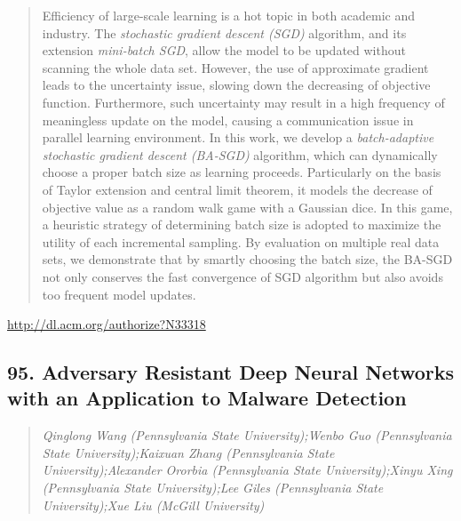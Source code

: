 \documentclass{article}
\begin{document}
\begin{quote}
Efficiency of large-scale learning is a hot topic in both academic and industry. The \emph{stochastic gradient descent (SGD)} algorithm, and its extension \emph{mini-batch SGD}, allow the model to be updated without scanning the whole data set. However, the use of approximate gradient leads to the uncertainty issue, slowing down the decreasing of objective function. Furthermore, such uncertainty may result in a high frequency of meaningless update on the model, causing a communication issue in parallel learning environment. In this work, we develop a \emph{batch-adaptive stochastic gradient descent (BA-SGD)} algorithm, which can dynamically choose a proper batch size as learning proceeds. Particularly on the basis of Taylor extension and central limit theorem, it models the decrease of objective value as a random walk game with a Gaussian dice. In this game, a heuristic strategy of determining batch size is adopted to maximize the utility of each incremental sampling. By evaluation on multiple real data sets, we demonstrate that by smartly choosing the batch size, the BA-SGD not only conserves the fast convergence of SGD algorithm but also avoids too frequent model updates.
\end{quote}

\href{http://dl.acm.org/authorize?N33318}{http://dl.acm.org/authorize?N33318}

\subsection{95. Adversary Resistant Deep Neural Networks with an Application to Malware Detection}

\begin{quote}
\footnotesize{\textit{Qinglong Wang (Pennsylvania State University);Wenbo Guo (Pennsylvania State University);Kaixuan Zhang (Pennsylvania State University);Alexander Ororbia (Pennsylvania State University);Xinyu Xing (Pennsylvania State University);Lee Giles (Pennsylvania State University);Xue Liu (McGill University)}}

\end{quote}
\end{document}
